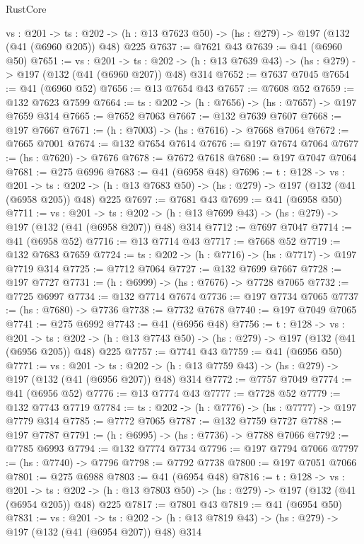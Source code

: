 \begin{lexlean}{RustCore}
\begin{coremodule}
  {vs : @201} ->
  {ts : @202} -> (h : @13 @7623 @50) -> (hs : @279) -> @197 (@132 (@41 (@6960 @205)) @48) @225
@7637 := @7621 @43
@7639 := @41 (@6960 @50)
@7651 := {vs : @201} ->
  {ts : @202} -> (h : @13 @7639 @43) -> (hs : @279) -> @197 (@132 (@41 (@6960 @207)) @48) @314
@7652 := @7637 @7045
@7654 := @41 (@6960 @52)
@7656 := @13 @7654 @43
@7657 := @7608 @52
@7659 := @132 @7623 @7599
@7664 := {ts : @202} -> (h : @7656) -> (hs : @7657) -> @197 @7659 @314
@7665 := @7652 @7063
@7667 := @132 @7639 @7607
@7668 := @197 @7667
@7671 := (h : @7003) -> (hs : @7616) -> @7668 @7064
@7672 := @7665 @7001
@7674 := @132 @7654 @7614
@7676 := @197 @7674 @7064
@7677 := (hs : @7620) -> @7676
@7678 := @7672 @7618
@7680 := @197 @7047 @7064
@7681 := @275 @6996
@7683 := @41 (@6958 @48)
@7696 := {t : @128} ->
  {vs : @201} ->
  {ts : @202} -> (h : @13 @7683 @50) -> (hs : @279) -> @197 (@132 (@41 (@6958 @205)) @48) @225
@7697 := @7681 @43
@7699 := @41 (@6958 @50)
@7711 := {vs : @201} ->
  {ts : @202} -> (h : @13 @7699 @43) -> (hs : @279) -> @197 (@132 (@41 (@6958 @207)) @48) @314
@7712 := @7697 @7047
@7714 := @41 (@6958 @52)
@7716 := @13 @7714 @43
@7717 := @7668 @52
@7719 := @132 @7683 @7659
@7724 := {ts : @202} -> (h : @7716) -> (hs : @7717) -> @197 @7719 @314
@7725 := @7712 @7064
@7727 := @132 @7699 @7667
@7728 := @197 @7727
@7731 := (h : @6999) -> (hs : @7676) -> @7728 @7065
@7732 := @7725 @6997
@7734 := @132 @7714 @7674
@7736 := @197 @7734 @7065
@7737 := (hs : @7680) -> @7736
@7738 := @7732 @7678
@7740 := @197 @7049 @7065
@7741 := @275 @6992
@7743 := @41 (@6956 @48)
@7756 := {t : @128} ->
  {vs : @201} ->
  {ts : @202} -> (h : @13 @7743 @50) -> (hs : @279) -> @197 (@132 (@41 (@6956 @205)) @48) @225
@7757 := @7741 @43
@7759 := @41 (@6956 @50)
@7771 := {vs : @201} ->
  {ts : @202} -> (h : @13 @7759 @43) -> (hs : @279) -> @197 (@132 (@41 (@6956 @207)) @48) @314
@7772 := @7757 @7049
@7774 := @41 (@6956 @52)
@7776 := @13 @7774 @43
@7777 := @7728 @52
@7779 := @132 @7743 @7719
@7784 := {ts : @202} -> (h : @7776) -> (hs : @7777) -> @197 @7779 @314
@7785 := @7772 @7065
@7787 := @132 @7759 @7727
@7788 := @197 @7787
@7791 := (h : @6995) -> (hs : @7736) -> @7788 @7066
@7792 := @7785 @6993
@7794 := @132 @7774 @7734
@7796 := @197 @7794 @7066
@7797 := (hs : @7740) -> @7796
@7798 := @7792 @7738
@7800 := @197 @7051 @7066
@7801 := @275 @6988
@7803 := @41 (@6954 @48)
@7816 := {t : @128} ->
  {vs : @201} ->
  {ts : @202} -> (h : @13 @7803 @50) -> (hs : @279) -> @197 (@132 (@41 (@6954 @205)) @48) @225
@7817 := @7801 @43
@7819 := @41 (@6954 @50)
@7831 := {vs : @201} ->
  {ts : @202} -> (h : @13 @7819 @43) -> (hs : @279) -> @197 (@132 (@41 (@6954 @207)) @48) @314

\end{coremodule}
\end{lexlean}

